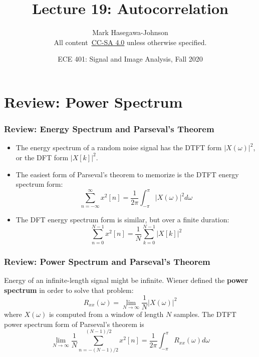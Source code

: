 \documentclass{beamer}
\title{Lecture 19: Autocorrelation}
\author{Mark Hasegawa-Johnson\\All content~\href{https://creativecommons.org/licenses/by-sa/4.0/}{CC-SA 4.0} unless otherwise specified.}
\date{ECE 401: Signal and Image Analysis, Fall 2020}
\begin{document}
\begin{frame}
  \maketitle
\end{frame}

\begin{frame}
  \tableofcontents
\end{frame}

\section[Review]{Review: Power Spectrum}
\setcounter{subsection}{1}

\begin{frame}
  \frametitle{Review: Energy Spectrum and Parseval's Theorem}
  \begin{itemize}
  \item The energy spectrum of a random noise signal has the DTFT form
    $|X(\omega)|^2$, or the DFT form $|X[k]|^2$.
  \item The easiest form of Parseval's theorem to memorize is the DTFT
    energy spectrum form:
    \[
    \sum_{n=-\infty}^\infty x^2[n] = \frac{1}{2\pi}\int_{-\pi}^\pi |X(\omega)|^2d\omega
    \]
  \item The DFT energy spectrum form is similar, but over a finite duration:
    \[
    \sum_{n=0}^{N-1}x^2[n] = \frac{1}{N}\sum_{k=0}^{N-1}|X[k]|^2
    \]
  \end{itemize}
\end{frame}

\begin{frame}
  \frametitle{Review: Power Spectrum and Parseval's Theorem}
  Energy of an infinite-length signal might be infinite.  Wiener
  defined the {\bf power spectrum} in order to solve that problem:
  \[
  R_{xx}(\omega) = \lim_{N\rightarrow\infty} \frac{1}{N}|X(\omega)|^2
  \]
  where $X(\omega)$ is computed from a window of length $N$ samples.
  The DTFT power spectrum form of Parseval's theorem is
  \[
  \lim_{N\rightarrow\infty} \frac{1}{N}\sum_{n=-(N-1)/2}^{(N-1)/2}x^2[n] =
  \frac{1}{2\pi}\int_{-\pi}^\pi R_{xx}(\omega)d\omega
  \]
\end{frame}  
\end{document}
